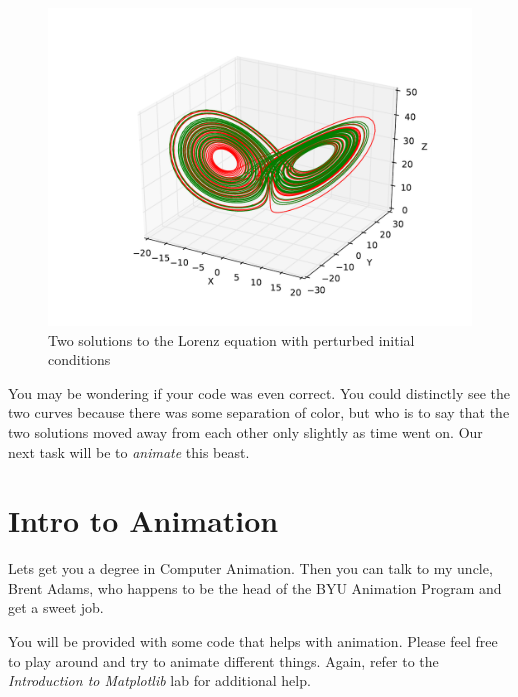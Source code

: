 \begin{figure}
\includegraphics[width=\textwidth]{figures/perturbed_lorenz.pdf}
\caption{Two solutions to the Lorenz equation with perturbed initial conditions}
\label{fig:perturbed_lorenz}
\end{figure}

You may be wondering if your code was even correct.
You could distinctly see the two curves because there was some separation of color, but who is to say that the two solutions moved away from each other only slightly as time went on.
Our next task will be to \textit{animate} this beast.

\section*{Intro to Animation}
Lets get you a degree in Computer Animation.
Then you can talk to my uncle, Brent Adams, who happens to be the head of the BYU Animation Program and get a sweet job.

\begin{warn}
You will be provided with some code that helps with animation.
Please feel free to play around and try to animate different things.
Again, refer to the \textit{Introduction to Matplotlib} lab for additional help.
\end{warn}

